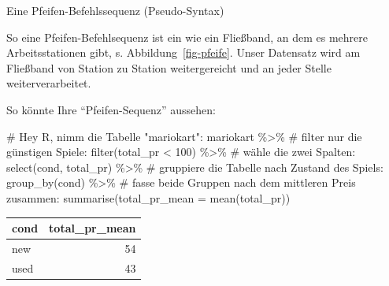 \documentclass[
  a4paper,
]{scrbook}
\newenvironment{Shaded}{\begin{snugshade}}{\end{snugshade}}
\newcommand{\AttributeTok}[1]{\textcolor[rgb]{0.40,0.45,0.13}{#1}}
\newcommand{\CommentTok}[1]{\textcolor[rgb]{0.37,0.37,0.37}{#1}}
\newcommand{\DecValTok}[1]{\textcolor[rgb]{0.68,0.00,0.00}{#1}}
\newcommand{\FunctionTok}[1]{\textcolor[rgb]{0.28,0.35,0.67}{#1}}
\newcommand{\NormalTok}[1]{\textcolor[rgb]{0.00,0.23,0.31}{#1}}
\newcommand{\SpecialCharTok}[1]{\textcolor[rgb]{0.37,0.37,0.37}{#1}}
\theoremstyle{definition}
\theoremstyle{definition}
\theoremstyle{definition}
\theoremstyle{remark}
\begin{document}
\begin{codelisting}

\caption{\label{lst-pfeife}Eine Pfeifen-Befehlssequenz (Pseudo-Syntax)}

\centering{

\begin{Shaded}
\begin{Highlighting}[]
\NormalTok{meine\_daten }\SpecialCharTok{\%\textgreater{}\%}
\NormalTok{  filter\_gewünschte}\FunctionTok{\_zeilen}\NormalTok{() }\SpecialCharTok{\%\textgreater{}\%}
\NormalTok{  wähle\_gewünschte}\FunctionTok{\_spalten}\NormalTok{() }\SpecialCharTok{\%\textgreater{}\%}
  \FunctionTok{gruppiere}\NormalTok{() }\SpecialCharTok{\%\textgreater{}\%}
  \FunctionTok{fasse\_zusammen}\NormalTok{() }
\end{Highlighting}
\end{Shaded}

}

\end{codelisting}%

So eine Pfeifen-Befehlsequenz ist ein wie ein Fließband, an dem es
mehrere Arbeitsstationen gibt, s. Abbildung~\ref{fig-pfeife}. Unser
Datensatz wird am Fließband von Station zu Station weitergereicht und an
jeder Stelle weiterverarbeitet.

So könnte Ihre ``Pfeifen-Sequenz'' aussehen:

\begin{Shaded}
\begin{Highlighting}[]
\CommentTok{\# Hey R, nimm die Tabelle "mariokart":}
\NormalTok{mariokart }\SpecialCharTok{\%\textgreater{}\%}  
   \CommentTok{\# filter nur die günstigen Spiele:}
  \FunctionTok{filter}\NormalTok{(total\_pr }\SpecialCharTok{\textless{}} \DecValTok{100}\NormalTok{) }\SpecialCharTok{\%\textgreater{}\%} 
  \CommentTok{\# wähle die zwei Spalten:}
  \FunctionTok{select}\NormalTok{(cond, total\_pr) }\SpecialCharTok{\%\textgreater{}\%}  
  \CommentTok{\# gruppiere die Tabelle nach Zustand des Spiels:}
  \FunctionTok{group\_by}\NormalTok{(cond) }\SpecialCharTok{\%\textgreater{}\%}  
  \CommentTok{\# fasse beide Gruppen nach dem mittleren Preis zusammen:}
  \FunctionTok{summarise}\NormalTok{(}\AttributeTok{total\_pr\_mean =} \FunctionTok{mean}\NormalTok{(total\_pr))  }
\end{Highlighting}
\end{Shaded}

\begin{longtable}[]{@{}lr@{}}
\toprule\noalign{}
cond & total\_pr\_mean \\
\midrule\noalign{}
\endhead
\bottomrule\noalign{}
\endlastfoot
new & 54 \\
used & 43 \\
\end{longtable}
\end{document}
